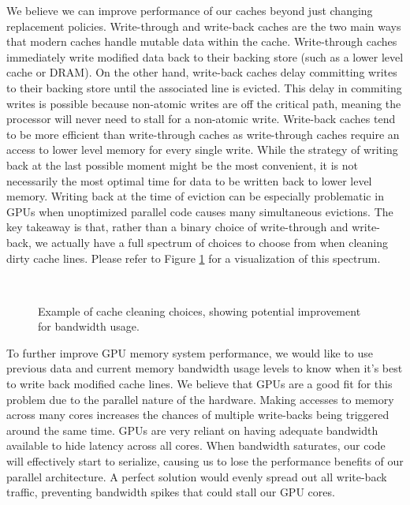 We believe we can improve performance of our caches beyond just changing replacement policies. Write-through and write-back caches are the two main ways that modern caches handle mutable data within the cache. Write-through caches immediately write modified data back to their backing store (such as a lower level cache or DRAM). On the other hand, write-back caches delay committing writes to their backing store until the associated line is evicted. This delay in commiting writes is possible because non-atomic writes are off the critical path, meaning the processor will never need to stall for a non-atomic write. Write-back caches tend to be more efficient than write-through caches as write-through caches require an access to lower level memory for every single write. While the strategy of writing back at the last possible moment might be the most convenient, it is not necessarily the most optimal time for data to be written back to lower level memory. Writing back at the time of eviction can be especially problematic in GPUs when unoptimized parallel code causes many simultaneous evictions. The key takeaway is that, rather than a binary choice of write-through and write-back, we actually have a full spectrum of choices to choose from when cleaning dirty cache lines. Please refer to Figure \ref{f:bandwidth_optimal} for a visualization of this spectrum.

\begin{figure}[htb]
\begin{center}
\ 
\caption{Example of cache cleaning choices, showing potential improvement for bandwidth usage.}
\label{f:bandwidth_optimal}
\end{center}
\end{figure}
%

To further improve GPU memory system performance, we would like to use previous data and current memory bandwidth usage levels to know when it’s best to write back modified cache lines. We believe that GPUs are a good fit for this problem due to the parallel nature of the hardware. Making accesses to memory across many cores increases the chances of multiple write-backs being triggered around the same time. GPUs are very reliant on having adequate bandwidth available to hide latency across all cores. When bandwidth saturates, our code will effectively start to serialize, causing us to lose the performance benefits of our parallel architecture. A perfect solution would evenly spread out all write-back traffic, preventing bandwidth spikes that could stall our GPU cores.
